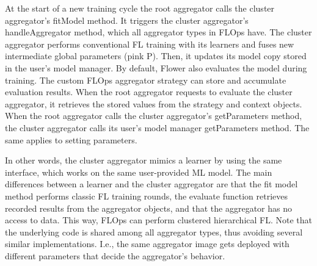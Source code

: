 At the start of a new training cycle the root aggregator calls the cluster aggregator's fitModel method.
It triggers the cluster aggregator's handleAggregator method, which all aggregator types in FLOps have.
The cluster aggregator performs conventional FL training with its learners and fuses new intermediate global parameters (pink P).
Then, it updates its model copy stored in the user's model manager.
By default, Flower also evaluates the model during training. The custom FLOps aggregator strategy can store and accumulate evaluation results.
When the root aggregator requests to evaluate the cluster aggregator, it retrieves the stored values from the strategy and context objects.
When the root aggregator calls the cluster aggregator's getParameters method, the cluster aggregator calls its user's model manager getParameters method.
The same applies to setting parameters.

In other words, the cluster aggregator mimics a learner by using the same interface, which works on the same user-provided ML model.
The main differences between a learner and the cluster aggregator are that the fit model method performs classic FL training rounds, the evaluate function retrieves recorded results from the aggregator objects, and that the aggregator has no access to data.
This way, FLOps can perform clustered hierarchical FL.
Note that the underlying code is shared among all aggregator types, thus avoiding several similar implementations.
I.e., the same aggregator image gets deployed with different parameters that decide the aggregator's behavior.
